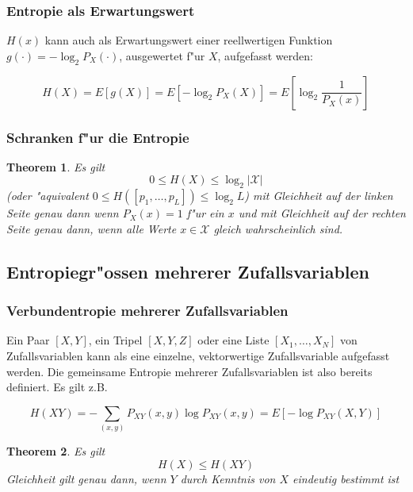 \documentclass[german, 10pt, a4paper, twocolumn]{scrartcl}
\newtheorem{theorem}{Theorem}
\begin{document}
\subsubsection{Entropie als Erwartungswert}

$H(x)$ kann auch als Erwartungswert einer reellwertigen Funktion $g(\cdotp)=-\log_2 P_X(\cdotp)$, ausgewertet f"ur $X$, aufgefasst werden:

\begin{displaymath}
	H(X) = E[g(X)] = E[-\log_2 P_X(X)]=E[\log_2 \frac{1}{P_X(x)}]
\end{displaymath}

\subsubsection{Schranken f"ur die Entropie}

\begin{theorem}
	Es gilt
	\begin{displaymath}
		0 \leq H(X) \leq \log_2|\mathcal{X}|
	\end{displaymath}
	(oder "aquivalent $0\leq H([p_1,\ldots,p_L]) \leq \log_2 L$) mit Gleichheit auf der linken Seite genau dann wenn $P_X(x)=1$ f"ur ein $x$ und mit Gleichheit auf der rechten Seite genau dann, wenn alle Werte $x\in \mathcal{X}$ gleich wahrscheinlich sind.
\end{theorem}

\subsection{Entropiegr"ossen mehrerer Zufallsvariablen}

\subsubsection{Verbundentropie mehrerer Zufallsvariablen}

Ein Paar $[X,Y]$, ein Tripel $[X,Y,Z]$ oder eine Liste $[X_1,\ldots,X_N]$ von Zufallsvariablen kann als eine einzelne, vektorwertige Zufallsvariable aufgefasst werden. Die gemeinsame Entropie mehrerer Zufallsvariablen ist also bereits definiert. Es gilt z.B.

\begin{displaymath}
	H(XY) = - \sum_{(x,y)} P_{XY}(x,y)\log P_{XY}(x,y)= E[-\log P_{XY}(X,Y)]
\end{displaymath}

\begin{theorem}
	Es gilt
	\begin{displaymath}
		H(X) \leq H(XY)
	\end{displaymath}
	Gleichheit gilt genau dann, wenn $Y$ durch Kenntnis von $X$ eindeutig bestimmt ist
\end{theorem}
\end{document}
